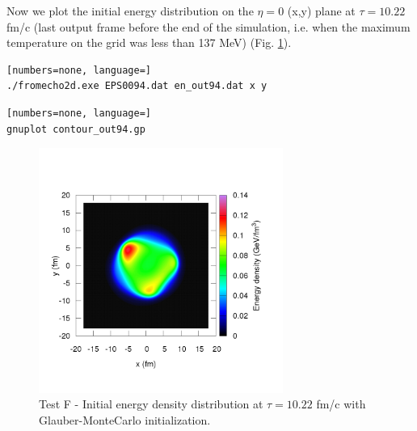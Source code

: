 Now we plot the initial energy distribution on the $\eta=0$ (x,y) plane at $\tau=10.22$ fm/c (last output frame before the end of the simulation, i.e. when the maximum temperature on the grid was less than 137 MeV) (Fig. \ref{fig:endens-gmc94}).
\begin{lstlisting}[numbers=none, language=]
./fromecho2d.exe EPS0094.dat en_out94.dat x y
\end{lstlisting}
\begin{lstlisting}[numbers=none, language=]
gnuplot contour_out94.gp
\end{lstlisting}

\begin{figure}[!h]
 \begin{center}
  \includegraphics[width=8cm]{images/gmc_energy_density_contour_at_eta_0_tau10_22.png}
   \caption{Test F - Initial energy density distribution at $\tau=10.22$ fm/c with Glauber-MonteCarlo initialization.}
    \label{fig:endens-gmc94}
 \end{center}
\end{figure}

